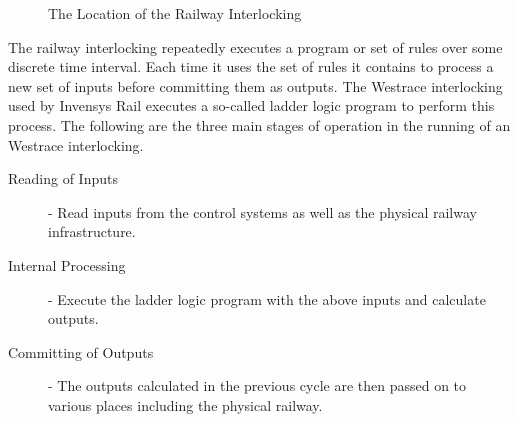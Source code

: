 \begin{figure}[h!]

\begin{center}
\end{center}

\caption{The Location of the Railway Interlocking}
\label{fig:trackstate}
\end{figure}



The railway interlocking repeatedly executes a program or set of rules over some discrete time
interval. Each time it uses the set of
rules it contains to process a new set of inputs before committing them as
outputs. The Westrace interlocking used by Invensys Rail executes a so-called
ladder logic program to perform this process. 
The following are the three main stages of operation in the running of an
Westrace interlocking.

\begin{description}

\item[Reading of Inputs] - Read inputs from the control systems as well as the physical railway infrastructure.

\item[Internal Processing] - Execute the ladder logic program with the above inputs and calculate outputs.

\item[Committing of Outputs] - The outputs calculated in the previous cycle are then passed on to various places including the physical railway.

\end{description}




